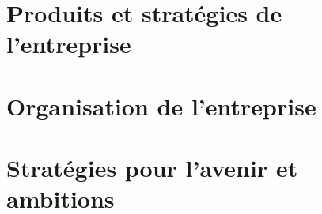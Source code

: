 \section{Produits et stratégies de l'entreprise}

\section{Organisation de l'entreprise}

\section{Stratégies pour l'avenir et ambitions}
